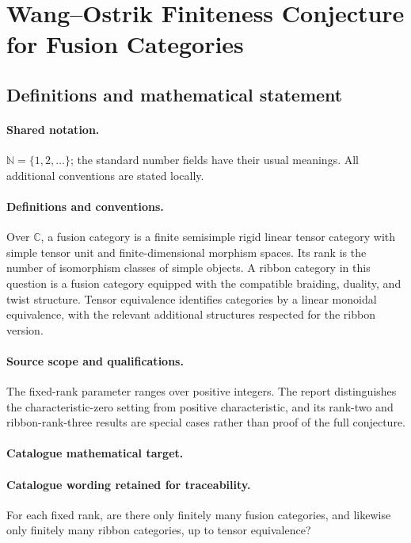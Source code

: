 \documentclass[11pt]{article}
\begin{document}
\section{Wang–Ostrik Finiteness Conjecture for Fusion Categories}\label{statement}

\subsection{Definitions and mathematical statement}

\paragraph{Shared notation.}$\mathbb N=\{1,2,\ldots\}$; the standard number fields have their usual meanings. All additional conventions are stated locally.


\paragraph{Definitions and conventions.} Over $\mathbb C$, a fusion category is a finite semisimple rigid linear tensor category with simple tensor unit and finite-dimensional morphism spaces. Its rank is the number of isomorphism classes of simple objects. A ribbon category in this question is a fusion category equipped with the compatible braiding, duality, and twist structure. Tensor equivalence identifies categories by a linear monoidal equivalence, with the relevant additional structures respected for the ribbon version.

\paragraph{Source scope and qualifications.} The fixed-rank parameter ranges over positive integers. The report distinguishes the characteristic-zero setting from positive characteristic, and its rank-two and ribbon-rank-three results are special cases rather than proof of the full conjecture.

\paragraph{Catalogue mathematical target.}
\paragraph{Catalogue wording retained for traceability.}
For each fixed rank, are there only finitely many fusion categories, and likewise only finitely many ribbon categories, up to tensor equivalence?
\end{document}
